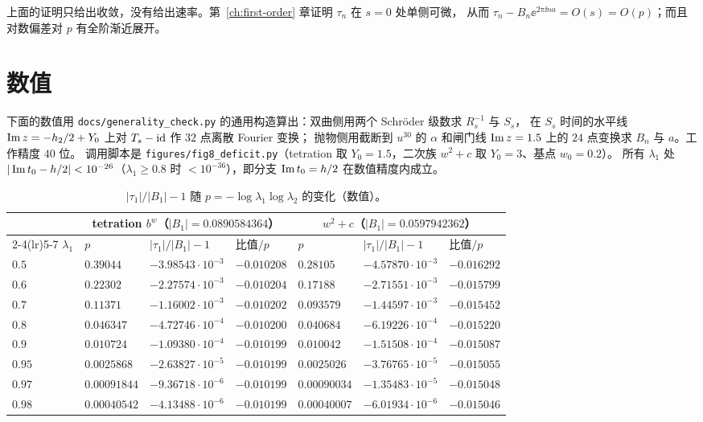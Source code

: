 \begin{remark}[收敛速率]\label{ch7:rem:rate}
上面的证明只给出收敛，没有给出速率。第~\ref{ch:first-order} 章证明 $\tau_n$ 在 $s=0$ 处单侧可微，
从而 $\tau_n-B_n\ee^{2\pi\ii na}=O(s)=O(p)$；而且对数偏差对 $p$ 有全阶渐近展开。
\end{remark}

\section{数值}\label{ch7:sec:numerics}

下面的数值用 \texttt{docs/generality\_check.py} 的通用构造算出：双曲侧用两个 Schröder 级数求 $R_s^{-1}$ 与 $S_s$，
在 $S_s$ 时间的水平线 $\operatorname{Im} z=-h_2/2+Y_0$ 上对 $T_s-\mathrm{id}$ 作 $32$ 点离散 Fourier 变换；
抛物侧用截断到 $u^{30}$ 的 $\alpha$ 和闸门线 $\operatorname{Im} z=1.5$ 上的 $24$ 点变换求 $B_n$ 与 $a$。工作精度 $40$ 位。
调用脚本是 \texttt{figures/fig8\_deficit.py}（tetration 取 $Y_0=1.5$，二次族 $w^2+c$ 取 $Y_0=3$、基点 $w_0=0.2$）。
所有 $\lambda_1$ 处 $|\operatorname{Im} t_0-h/2|<10^{-26}$（$\lambda_1\ge0.8$ 时 $<10^{-36}$），即分支 $\operatorname{Im} t_0=h/2$ 在数值精度内成立。

\begin{table}[htbp]
\centering
\caption{$|\tau_1|/|B_1|-1$ 随 $p=-\log\lambda_1\log\lambda_2$ 的变化（数值）。}
\label{ch7:tab:approach}
\small\setlength{\tabcolsep}{5pt}
\begin{tabular}{lllllll}
\toprule
& \multicolumn{3}{c}{tetration $b^w$（$|B_1|=0.0890584364$）} & \multicolumn{3}{c}{$w^2+c$（$|B_1|=0.0597942362$）}\\
\cmidrule(lr){2-4}\cmidrule(lr){5-7}
$\lambda_1$ & $p$ & $|\tau_1|/|B_1|-1$ & 比值$/p$ & $p$ & $|\tau_1|/|B_1|-1$ & 比值$/p$\\
\midrule
$0.5$  & $0.39044$ & $-3.98543\cdot10^{-3}$ & $-0.010208$ & $0.28105$ & $-4.57870\cdot10^{-3}$ & $-0.016292$\\
$0.6$  & $0.22302$ & $-2.27574\cdot10^{-3}$ & $-0.010204$ & $0.17188$ & $-2.71551\cdot10^{-3}$ & $-0.015799$\\
$0.7$  & $0.11371$ & $-1.16002\cdot10^{-3}$ & $-0.010202$ & $0.093579$ & $-1.44597\cdot10^{-3}$ & $-0.015452$\\
$0.8$  & $0.046347$ & $-4.72746\cdot10^{-4}$ & $-0.010200$ & $0.040684$ & $-6.19226\cdot10^{-4}$ & $-0.015220$\\
$0.9$  & $0.010724$ & $-1.09380\cdot10^{-4}$ & $-0.010199$ & $0.010042$ & $-1.51508\cdot10^{-4}$ & $-0.015087$\\
$0.95$ & $0.0025868$ & $-2.63827\cdot10^{-5}$ & $-0.010199$ & $0.0025026$ & $-3.76765\cdot10^{-5}$ & $-0.015055$\\
$0.97$ & $0.00091844$ & $-9.36718\cdot10^{-6}$ & $-0.010199$ & $0.00090034$ & $-1.35483\cdot10^{-5}$ & $-0.015048$\\
$0.98$ & $0.00040542$ & $-4.13488\cdot10^{-6}$ & $-0.010199$ & $0.00040007$ & $-6.01934\cdot10^{-6}$ & $-0.015046$\\
\bottomrule
\end{tabular}
\end{table}

